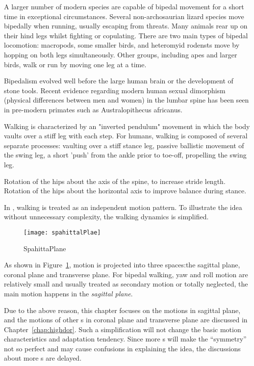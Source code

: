 A larger number of modern species are capable of bipedal movement for a short time in exceptional circumstances.
Several non-archosaurian lizard species move bipedally when running, usually escaping from threats. 
Many animals rear up on their hind legs whilst fighting or copulating. 
There are two main types of bipedal locomotion: macropods, some smaller birds, and heteromyid rodensts move by hopping on both legs simultaneously. Other groups, including apes and larger birds, walk or run by moving one leg at a time.

Bipedalism evolved well before the large human brain or the development of stone tools.
Recent evidence regarding modern human sexual dimorphism (physical differences between men and women) in the lumbar spine has been seen in pre-modern primates such as Australopithecus africanus. 





Walking is characterized by an "inverted pendulum" movement in which the body vaults over a stiff leg with each step.
For humans, walking is composed of several separate processes:
vaulting over a stiff stance leg,
passive ballistic movement of the swing leg,
a short 'push' from the ankle prior to toe-off, propelling the swing leg.

Rotation of the hips about the axis of the spine, to increase stride length.
Rotation of the hips about the horizontal axis to improve balance during stance.

In \moit, walking is treated as an independent motion pattern.
To illustrate the idea without unnecessary complexity, the walking dynamics is simplified.


\begin{figure}[!htbp]
  \begin{center}
    \texttt{[image: spahittalPlae]}
    \caption{SpahittaPlane}
    \label{fig:passivekneewalker}
\end{center}
\end{figure}

As shown in Figure~\ref{fig:passivekneewalker}, motion is projected into three spaces:the sagittal plane, coronal plane and transverse plane.
For bipedal walking,
 yaw and roll motion are relatively small and usually treated as secondary motion or totally neglected,  the main motion happens in the \emph{sagittal plane}.




Due to the above reason, this chapter focuses on the motions in sagittal plane, and  the motions of other \dof s in coronal plane and transverse plane are discussed in Chapter~\ref{chap:highdor}.
Such a simplification will not change the basic motion characteristics and adaptation tendency.
Since more {\dof}s will make the ``symmetry'' not so perfect and may cause confusions in explaining the idea, the discussions about more {\dof}s are delayed.



